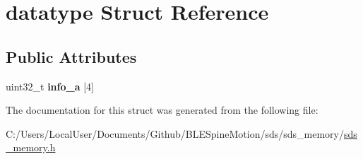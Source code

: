 \hypertarget{structdatatype}{}\section{datatype Struct Reference}
\label{structdatatype}
\subsection*{Public Attributes}
\begin{DoxyCompactItemize}
\item 
\mbox{\label{structdatatype_ab61b5af698e6cfc867942d9446a493d6}} 
uint32\+\_\+t {\bfseries info\+\_\+a} \mbox{[}4\mbox{]}
\end{DoxyCompactItemize}


The documentation for this struct was generated from the following file\+:\begin{DoxyCompactItemize}
\item 
C\+:/\+Users/\+Local\+User/\+Documents/\+Github/\+B\+L\+E\+Spine\+Motion/sds/sds\+\_\+memory/\mbox{\hyperlink{sds__memory_8h}{sds\+\_\+memory.\+h}}\end{DoxyCompactItemize}
